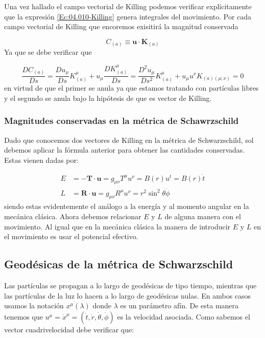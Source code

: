 \documentclass[12pt,a4paper]{book}
\numberwithin{equation}{section}
\numberwithin{figure}{section}
\newcommand{\un}{\mathbf{u}}
\newcommand{\Kn}{\mathbf{K}}
\newcommand{\Rn}{\mathbf{R}}
\newcommand{\Tn}{\mathbf{T}}
\begin{document}
Una vez hallado el campo vectorial de Killing podemos verificar explícitamente que la expresión \ref{Ec:04.010-Killing} genera integrales del movimiento. Por cada campo vectorial de Killing que encoremos exisitirá la magnitud conservada

\begin{equation}
C_{(a)} \equiv \un \cdot \Kn_{(a)}
\end{equation}
Ya que se debe verificar que

\begin{equation}
\frac{D C_{(a)}}{D s} = \frac{D u_\mu}{D s} K^\mu_{(a)} + u_\mu \frac{D K^\mu_{(a)}}{D s} =  \frac{D^2 u_\mu}{D s^2} K^\mu_{(a)} + u_\mu u^\nu K_{(a) (\mu;\nu)} = 0 
\end{equation}
en virtud de que el primer se anula ya que estamos tratando con partículas libres y el segundo se anula bajo la hipótesis de que es vector de Killing.


\subsubsection{Magnitudes conservadas en la métrica de Schawrzschild}

Dado que conocemos dos vectores de Killing en la métrica de Schwarzschild, sol debemos aplicar la fórmula anterior para obtener las cantidades conservadas. Estas vienen dadas por:

\begin{align}
E  & = - \Tn \cdot \un = g_{\mu \nu} T^\mu u^\nu = B(r) u^t = B(r) \dot{t} \\
L  & =  \Rn \cdot \un = g_{\mu \nu} R^\mu u^\nu = r^2 \sin^2 \theta \dot{\phi}
\end{align}
siendo estas evidentemente el análogo a la energía y al momento angular en la mecánica clásica. Ahora debemos relacionar $E$ y $L$ de alguna manera con el movimiento. Al igual que en la mecánica clásica la manera de introducir $E$ y $L$ en el movimiento es usar el potencial efectivo. \\


\subsection{Geodésicas de la métrica de Schwarzschild}

Las partículas se propagan a lo largo de geodésicas de tipo tiempo, mientras que las partículas de la luz lo hacen a lo largo de geodésicas nulas. En ambos casos usamos la notación $x^\mu (\lambda)$ donde $\lambda$ es un parámetro afín. De esta manera tenemos que $u^\mu = \dot{x}^\mu=(\dot{t},\dot{r},\dot{\theta},\dot{\phi})$ es la velocidad asociada. Como sabemos el vector cuadrivelocidad debe verificar que:
\end{document}
